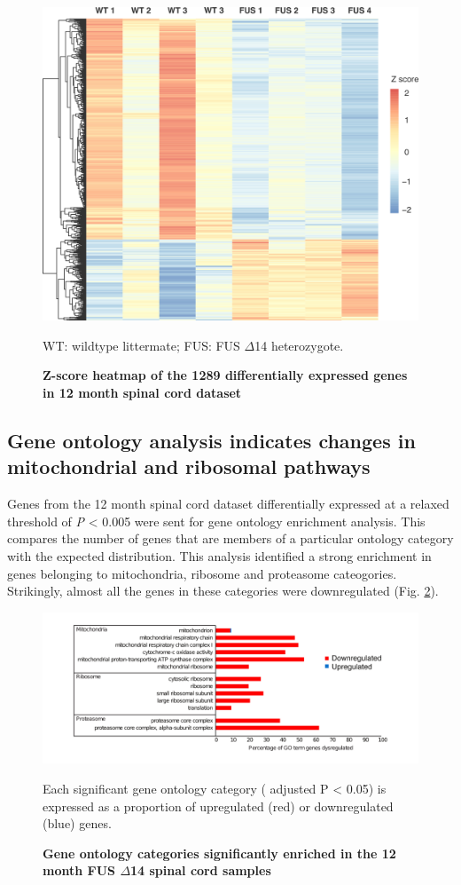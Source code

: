 \begin{figure}[h!]
	\centering
	\includegraphics[width=\textwidth]{Figures/04_fus_mice/anny_normalised_heatmap.png}
	\caption{\textbf{Z-score heatmap of the 1289 differentially expressed genes in 12 month spinal cord dataset}}
	WT: wildtype littermate; FUS: FUS $\Delta$14 heterozygote. 
	\label{fig:delta14_heatmap}
\end{figure}


\subsection{Gene ontology analysis indicates changes in mitochondrial and ribosomal pathways}
Genes from the 12 month spinal cord dataset differentially expressed at a relaxed threshold of \textit{P} < 0.005 were sent for gene ontology enrichment analysis. This compares the number of genes that are members of a particular ontology category with the expected distribution. This analysis identified a strong enrichment in genes belonging to mitochondria, ribosome and proteasome cateogories. Strikingly, almost all the genes in these categories were downregulated (Fig. \ref{fig:delta14_go}).

\begin{figure}[h!]
	\centering
	\includegraphics[width=12cm]{Figures/04_fus_mice/anny_GO_terms.png}
	\caption{\textbf{Gene ontology categories significantly enriched in the 12 month FUS $\Delta$14 spinal cord samples}}
		Each significant gene ontology category ( adjusted P < 0.05) is expressed as a proportion of upregulated (red) or downregulated (blue) genes.
		\label{fig:delta14_go}
\end{figure}


